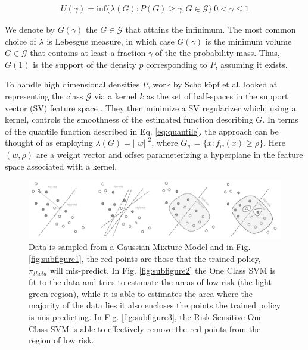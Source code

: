 \documentclass[10pt, conference]{ieeeconf}      %
\begin{document}
\vspace{-2ex}
\begin{align}\label{eq:quantile}
U(\gamma) = \mbox{inf} \lbrace \lambda(G):P(G) \geq \gamma, G \in \mathcal{G} \rbrace \: 0<\gamma \leq 1
\end{align} 


We denote by $G(\gamma)$ the $G \in \mathcal{G}$ that attains the infinimum. The most common choice of $\lambda$ is Lebesgue measure, in which case $G(\gamma)$ is the minimum volume $G \in \mathcal{G}$ that contains at least a fraction $\gamma$ of the the probability mass. Thus, $G(1)$ is the support of the density $p$ corresponding to $P$, assuming it exists. 

To handle high dimensional densities $P$, work by Scholk{\"o}pf et al.  looked at representing the class $\mathcal{G}$ via a kernel $k$ as the set of half-spaces in the support vector (SV) feature space \cite{scholkopf2001estimating}. They then minimize a SV  regularizer which, using a kernel, controls the smoothness of the estimated function describing $G$. In terms of the quantile function described in Eq. \ref{eq:quantile}, the approach can be thought of as employing $\lambda(G) = ||w||^2$, where $G_w = \lbrace x: f_w(x) \geq \rho \rbrace$. Here $(w,\rho)$ are a weight vector and offset parameterizing a hyperplane in the feature space associated with a kernel. 


\begin{figure}[ht]
\centering

\includegraphics[width=\textwidth]{figures/active_learning.pdf}

\caption{Data is sampled from a Gaussian Mixture Model and in Fig. \ref{fig:subfigure1}, the red points are those that the trained policy, $\pi_{theta}$ will mis-predict. In Fig. \ref{fig:subfigure2} the One Class SVM is fit to the data and tries to estimate the areas of low risk (the light green region), while it is able to estimates the area where the majority of the data lies it also encloses the points the trained policy is mis-predicting. In Fig. \ref{fig:subfigure3}, the Risk Sensitive One Class SVM is able to effectively remove the red points from the region of low risk.}
\label{fig:support_example}
\end{figure}
\end{document}
